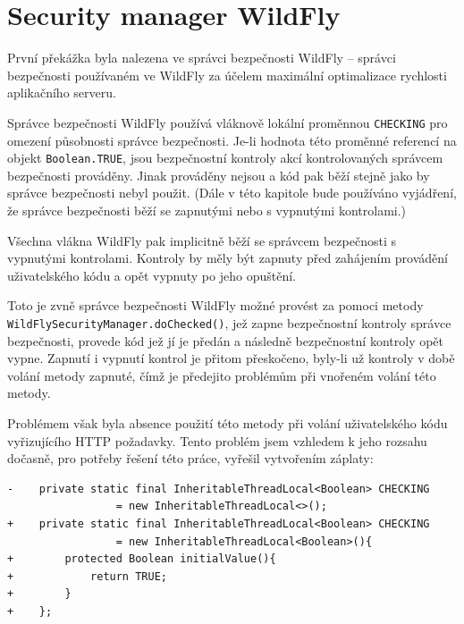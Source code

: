 \section{Security manager WildFly}

První překážka byla nalezena ve správci bezpečnosti WildFly -- správci bezpečnosti používaném ve WildFly za účelem maximální optimalizace rychlosti aplikačního serveru.

Správce bezpečnosti WildFly používá vláknově lokální proměnnou {\tt CHECKING} pro omezení působnosti správce bezpečnosti. Je-li hodnota této proměnné referencí na objekt {\tt Boolean.TRUE}, jsou bezpečnostní kontroly akcí kontrolovaných správcem bezpečnosti prováděny. Jinak prováděny nejsou a kód pak běží stejně jako by správce bezpečnosti nebyl použit. \cite{sourceWildFlySecurityManager} (Dále v této kapitole bude používáno vyjádření, že správce bezpečnosti běží se zapnutými nebo s vypnutými kontrolami.)

Všechna vlákna WildFly pak implicitně běží se správcem bezpečnosti s vypnutými kontrolami. Kontroly by měly být zapnuty před zahájením provádění uživatelského kódu a opět vypnuty po jeho opuštění. \cite{sourceWildFlySecurityManager}

Toto je zvně správce bezpečnosti WildFly možné provést za pomoci metody {\tt WildFlySecurityManager.doChecked()}, jež zapne bezpečnostní kontroly správce bezpečnosti, provede kód jež jí je předán a následně bezpečnostní kontroly opět vypne. Zapnutí i vypnutí kontrol je přitom přeskočeno, byly-li už kontroly v době volání metody zapnuté, čímž je předejito problémům při vnořeném volání této metody. \cite{sourceWildFlySecurityManager}

Problémem však byla absence použití této metody při volání uživatelského kódu vyřizujícího HTTP požadavky. Tento problém jsem vzhledem k jeho rozsahu dočasně, pro potřeby řešení této práce, vyřešil vytvořením záplaty:

\begin{lstlisting}[caption=Záplata správce bezpečnosti WildFly nastavující bezpečnostní kontroly na implicitně zapnuté, label=patchSM]
-    private static final InheritableThreadLocal<Boolean> CHECKING
                 = new InheritableThreadLocal<>();
+    private static final InheritableThreadLocal<Boolean> CHECKING
                 = new InheritableThreadLocal<Boolean>(){
+        protected Boolean initialValue(){
+            return TRUE;
+        }
+    };
\end{lstlisting}

